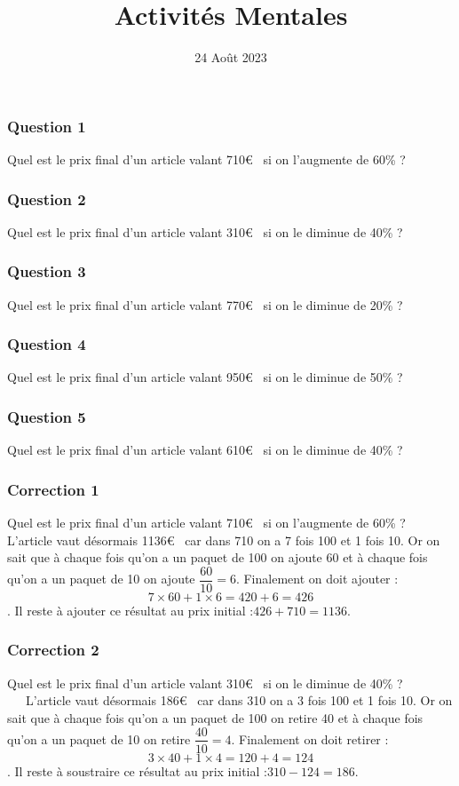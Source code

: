 \documentclass[15pt, mathserif]{beamer}
\title{Activités Mentales}
\date{24 Août 2023}
\begin{document}
\begin{frame}
    \titlepage
\end{frame}

\begin{frame} 
	\frametitle{Question 1}
Quel est le prix final d'un article valant 710\euro ~ si on l'augmente de 60\% ?\end{frame}


\begin{frame} 
	\frametitle{Question 2}
Quel est le prix final d'un article valant 310\euro ~ si on le diminue de 40\% ?\end{frame}


\begin{frame} 
	\frametitle{Question 3}
Quel est le prix final d'un article valant 770\euro ~ si on le diminue de 20\% ?\end{frame}


\begin{frame} 
	\frametitle{Question 4}
Quel est le prix final d'un article valant 950\euro ~ si on le diminue de 50\% ?\end{frame}


\begin{frame} 
	\frametitle{Question 5}
Quel est le prix final d'un article valant 610\euro ~ si on le diminue de 40\% ?\end{frame}


\begin{frame}
\vspace{-10mm}
	\frametitle{Correction 1}
Quel est le prix final d'un article valant 710\euro ~ si on l'augmente de 60\% ? \\ L'article vaut désormais 1136\euro ~ car dans 710 on a 7 fois 100 et 1 fois 10. Or on sait que à chaque fois qu'on a un paquet de 100 on ajoute 60 et à chaque fois qu'on a un paquet de 10 on ajoute $\dfrac{60}{10}=6$. Finalement on doit ajouter : $$7\times 60 + 1\times6 = 420+6=426$$. Il reste à ajouter ce résultat au prix initial :$426+710=1136$.\end{frame}


\begin{frame}
\vspace{-10mm}
	\frametitle{Correction 2}
Quel est le prix final d'un article valant 310\euro ~ si on le diminue de 40\% ? \\ ~~\ L'article vaut désormais 186\euro ~ car dans 310 on a 3 fois 100 et 1 fois 10. Or on sait que à chaque fois qu'on a un paquet de 100 on retire 40 et à chaque fois qu'on a un paquet de 10 on retire $\dfrac{40}{10}=4$. Finalement on doit retirer : $$3\times 40 + 1\times4 = 120+4=124$$. Il reste à soustraire ce résultat au prix initial :$310-124=186$.\end{frame}
\end{document}
